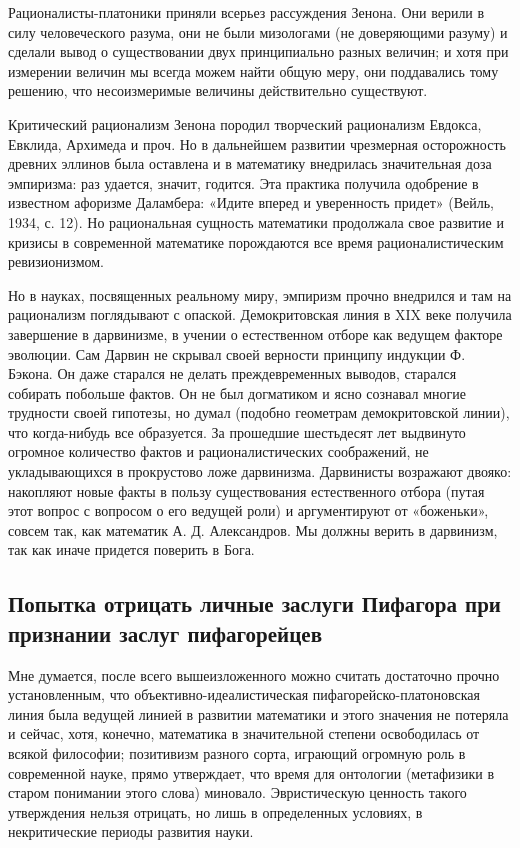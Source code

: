 Рационалисты-платоники приняли всерьез рассуждения Зенона. Они верили
в силу человеческого разума, они не были мизологами (не доверяющими
разуму) и сделали вывод о существовании двух принципиально разных
величин; и хотя при измерении величин мы всегда можем найти общую
меру, они поддавались тому решению, что несоизмеримые величины
действительно существуют.

Критический рационализм Зенона породил творческий рационализм Евдокса,
Евклида, Архимеда и проч. Но в дальнейшем развитии чрезмерная
осторожность древних эллинов была оставлена и в математику внедрилась
значительная доза эмпиризма: раз удается, значит, годится. Эта
практика получила одобрение в известном афоризме Даламбера: «Идите
вперед и уверенность придет» (Вейль, 1934, с. 12). Но рациональная
сущность математики продолжала свое развитие и кризисы в современной
математике порождаются все время рационалистическим ревизионизмом.

Но в науках, посвященных реальному миру, эмпиризм прочно внедрился и
там на рационализм поглядывают с опаской. Демокритовская линия в XIX
веке получила завершение в дарвинизме, в учении о естественном отборе
как ведущем факторе эволюции. Сам Дарвин не скрывал своей верности
принципу индукции Ф. Бэкона. Он даже старался не делать
преждевременных выводов, старался собирать побольше фактов. Он не был
догматиком и ясно сознавал многие трудности своей гипотезы, но думал
(подобно геометрам демокритовской линии), что когда-нибудь все
образуется. За прошедшие шестьдесят лет выдвинуто огромное количество
фактов и рационалистических соображений, не укладывающихся в
прокрустово ложе дарвинизма. Дарвинисты возражают двояко: накопляют
новые факты в пользу существования естественного отбора (путая этот
вопрос с вопросом о его ведущей роли) и аргументируют от «боженьки»,
совсем так, как математик А. Д. Александров. Мы должны верить в
дарвинизм, так как иначе придется поверить в Бога.

\subsection{Попытка отрицать личные заслуги Пифагора при признании
заслуг пифагорейцев}

Мне думается, после всего вышеизложенного можно считать достаточно
прочно установленным, что объективно-идеалистическая
пифагорейско-платоновская линия была ведущей линией в развитии
математики и этого значения не потеряла и сейчас, хотя, конечно,
математика в значительной степени освободилась от всякой философии;
позитивизм разного сорта, играющий огромную роль в современной науке,
прямо утверждает, что время для онтологии (метафизики в старом
понимании этого слова) миновало. Эвристическую ценность такого
утверждения нельзя отрицать, но лишь в определенных условиях, в
некритические периоды развития науки.

